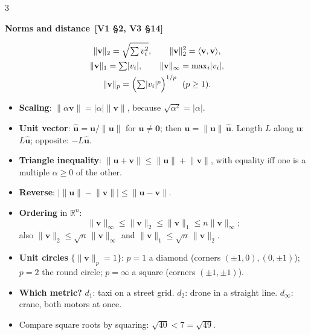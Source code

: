 \documentclass[8pt]{extarticle}
\newcommand{\sub}[1]{\par\vspace{3pt}\noindent
  {\color{RoyalBlue}\bfseries\sffamily #1}\par\vspace{0.5pt}}
\newcommand{\src}[1]{{\color{gray}\,[#1]}}
\newcommand{\R}{\mathbb{R}}
\newcommand{\vc}[1]{\mathbf{#1}}
\newcommand{\uv}[1]{\hat{\vc{#1}}}
\newcommand{\norm}[1]{\lVert #1\rVert}
\newcommand{\ip}[2]{\langle #1,#2\rangle}
\begin{document}
\begin{multicols*}{3}
\sub{2.2\enspace Norms and distance \src{V1 \S2, V3 \S14}}
\begin{gather*}
  \norm{\vc{v}}_2=\sqrt{\textstyle\sum v_i^{2}},\qquad
  \norm{\vc{v}}_2^{2}=\ip{\vc{v}}{\vc{v}},\\
  \norm{\vc{v}}_1=\textstyle\sum\lvert v_i\rvert,\qquad
  \norm{\vc{v}}_\infty=\max_i\lvert v_i\rvert,\\
  \norm{\vc{v}}_p=\Bigl(\textstyle\sum\lvert v_i\rvert^{p}\Bigr)^{1/p}
  \ \ (p\ge1).
\end{gather*}
\begin{itemize}
  \item \textbf{Scaling}: $\norm{\alpha\vc{v}}=\lvert\alpha\rvert\norm{\vc{v}}$,
        because $\sqrt{\alpha^{2}}=\lvert\alpha\rvert$.
  \item \textbf{Unit vector}: $\uv{u}=\vc{u}/\norm{\vc{u}}$ for
        $\vc{u}\neq\vc{0}$; then $\vc{u}=\norm{\vc{u}}\,\uv{u}$. Length $L$
        along $\vc{u}$: $L\uv{u}$; opposite: $-L\uv{u}$.
  \item \textbf{Triangle inequality}:
        $\norm{\vc{u}+\vc{v}}\le\norm{\vc{u}}+\norm{\vc{v}}$, with equality
        iff one is a multiple $\alpha\ge0$ of the other.
  \item \textbf{Reverse}:
        $\bigl\lvert\norm{\vc{u}}-\norm{\vc{v}}\bigr\rvert\le\norm{\vc{u}-\vc{v}}$.
  \item \textbf{Ordering} in $\R^{n}$:
        \[\norm{\vc{v}}_\infty\le\norm{\vc{v}}_2\le\norm{\vc{v}}_1\le n\norm{\vc{v}}_\infty;\]
        also $\norm{\vc{v}}_2\le\sqrt n\,\norm{\vc{v}}_\infty$ and
        $\norm{\vc{v}}_1\le\sqrt n\,\norm{\vc{v}}_2$.
  \item \textbf{Unit circles} $\{\norm{\vc{v}}_p=1\}$: $p=1$ a diamond
        (corners $(\pm1,0),(0,\pm1)$); $p=2$ the round circle; $p=\infty$ a
        square (corners $(\pm1,\pm1)$).
  \item \textbf{Which metric?} $d_1$: taxi on a street grid. $d_2$: drone in
        a straight line. $d_\infty$: crane, both motors at once.
  \item Compare square roots by squaring: $\sqrt{40}<7=\sqrt{49}$.
\end{itemize}


\end{multicols*}
\end{document}
